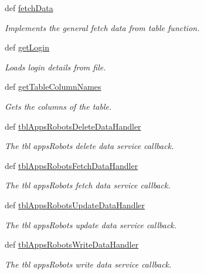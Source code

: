 \begin{DoxyCompactItemize}
def \hyperlink{classmysql__wrapper_1_1MySQLdbWrapper_af3d0d075cbbefe8edb35f5c3755a0df1}{fetch\-Data}
\begin{DoxyCompactList}\small\item\em Implements the general fetch data from table function. \end{DoxyCompactList}\item 
def \hyperlink{classmysql__wrapper_1_1MySQLdbWrapper_aee044e7881e8cf2606237381e22c506a}{get\-Login}
\begin{DoxyCompactList}\small\item\em Loads login details from file. \end{DoxyCompactList}\item 
def \hyperlink{classmysql__wrapper_1_1MySQLdbWrapper_a563e04fe07ecfc2d15461a4c4bdba65a}{get\-Table\-Column\-Names}
\begin{DoxyCompactList}\small\item\em Gets the columns of the table. \end{DoxyCompactList}\item 
def \hyperlink{classmysql__wrapper_1_1MySQLdbWrapper_a852f7e728094779c7b714f37134b1c2f}{tbl\-Apps\-Robots\-Delete\-Data\-Handler}
\begin{DoxyCompactList}\small\item\em The tbl apps\-Robots delete data service callback. \end{DoxyCompactList}\item 
def \hyperlink{classmysql__wrapper_1_1MySQLdbWrapper_a8e7137bc387d4819ed6b83c2ed74b1ec}{tbl\-Apps\-Robots\-Fetch\-Data\-Handler}
\begin{DoxyCompactList}\small\item\em The tbl apps\-Robots fetch data service callback. \end{DoxyCompactList}\item 
def \hyperlink{classmysql__wrapper_1_1MySQLdbWrapper_aaa2981bc29ea8bc71076e9a1a61b6e9f}{tbl\-Apps\-Robots\-Update\-Data\-Handler}
\begin{DoxyCompactList}\small\item\em The tbl apps\-Robots update data service callback. \end{DoxyCompactList}\item 
def \hyperlink{classmysql__wrapper_1_1MySQLdbWrapper_a09e1d460e7df82ba32cbd6943c9c16b8}{tbl\-Apps\-Robots\-Write\-Data\-Handler}
\begin{DoxyCompactList}\small\item\em The tbl apps\-Robots write data service callback. \end{DoxyCompactList}\item 

\end{DoxyCompactItemize}
